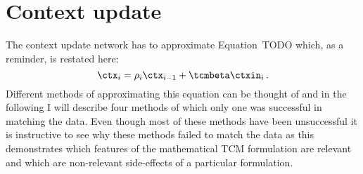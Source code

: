 \chapter{Context update}

The context update network has to approximate Equation~TODO which, as a reminder, is restated here:
\begin{equation}
    \ctx_i = \rho_i \ctx_{i-1} + \tcmbeta \ctxin_i\,\text{.} \label{eqn:ctx-update}
\end{equation}
Different methods of approximating this equation can be thought of and in the following I will describe four methods of which only one was successful in matching the data.
Even though most of these methods have been unsuccessful it is instructive to see why these methods failed to match the data as this demonstrates which features of the mathematical TCM formulation are relevant and which are non-relevant side-effects of a particular formulation.

